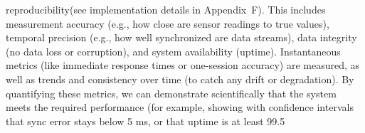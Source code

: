 reproducibility(see implementation details in Appendix~F). This includes measurement accuracy (e.g., how close are sensor readings to true values), temporal precision (e.g., how well synchronized are data streams), data integrity (no data loss or corruption), and system availability (uptime). Instantaneous metrics (like immediate response times or one-session accuracy) are measured, as well as trends and consistency over time (to catch any drift or degradation). By quantifying these metrics, we can demonstrate scientifically that the system meets the required performance (for example, showing with confidence intervals that sync error stays below 5 ms, or that uptime is at least 99.5%